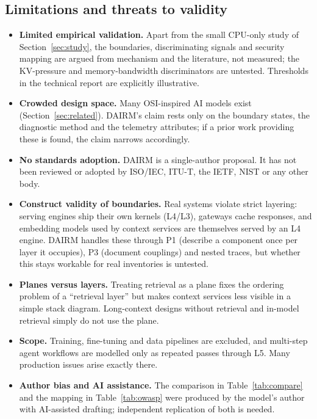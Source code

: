 \documentclass[11pt]{article}
\begin{document}
\subsection{Limitations and threats to validity}
\begin{itemize}[leftmargin=*,itemsep=2pt]
\item \textbf{Limited empirical validation.} Apart from the small CPU-only study of Section~\ref{sec:study}, the boundaries, discriminating signals and security mapping are argued from mechanism and the literature, not measured; the KV-pressure and memory-bandwidth discriminators are untested. Thresholds in the technical report are explicitly illustrative.
\item \textbf{Crowded design space.} Many OSI-inspired AI models exist (Section~\ref{sec:related}). DAIRM's claim rests only on the boundary states, the diagnostic method and the telemetry attributes; if a prior work providing these is found, the claim narrows accordingly.
\item \textbf{No standards adoption.} DAIRM is a single-author proposal. It has not been reviewed or adopted by ISO/IEC, ITU-T, the IETF, NIST or any other body.
\item \textbf{Construct validity of boundaries.} Real systems violate strict layering: serving engines ship their own kernels (L4/L3), gateways cache responses, and embedding models used by context services are themselves served by an L4 engine. DAIRM handles these through P1 (describe a component once per layer it occupies), P3 (document couplings) and nested traces, but whether this stays workable for real inventories is untested.
\item \textbf{Planes versus layers.} Treating retrieval as a plane fixes the ordering problem of a ``retrieval layer'' but makes context services less visible in a simple stack diagram. Long-context designs without retrieval and in-model retrieval simply do not use the plane.
\item \textbf{Scope.} Training, fine-tuning and data pipelines are excluded, and multi-step agent workflows are modelled only as repeated passes through L5. Many production issues arise exactly there.
\item \textbf{Author bias and AI assistance.} The comparison in Table~\ref{tab:compare} and the mapping in Table~\ref{tab:owasp} were produced by the model's author with AI-assisted drafting; independent replication of both is needed.
\end{itemize}
\end{document}

